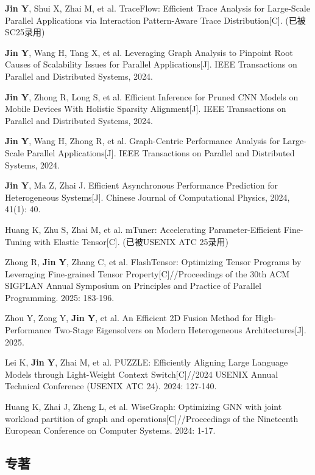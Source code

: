 \begin{resume}
  \begin{achievements}
    \item \textbf{Jin Y}, Shui X, Zhai M, et al. TraceFlow: Efficient Trace Analysis for Large-Scale Parallel Applications via Interaction Pattern-Aware Trace Distribution[C]. (已被SC25录用)
    \item \textbf{Jin Y}, Wang H, Tang X, et al. Leveraging Graph Analysis to Pinpoint Root Causes of Scalability Issues for Parallel Applications[J]. IEEE Transactions on Parallel and Distributed Systems, 2024.
    \item \textbf{Jin Y}, Zhong R, Long S, et al. Efficient Inference for Pruned CNN Models on Mobile Devices With Holistic Sparsity Alignment[J]. IEEE Transactions on Parallel and Distributed Systems, 2024.
    \item \textbf{Jin Y}, Wang H, Zhong R, et al. Graph-Centric Performance Analysis for Large-Scale Parallel Applications[J]. IEEE Transactions on Parallel and Distributed Systems, 2024.
    \item \textbf{Jin Y}, Ma Z, Zhai J. Efficient Asynchronous Performance Prediction for Heterogeneous Systems[J]. Chinese Journal of Computational Physics, 2024, 41(1): 40.
    \item Huang K, Zhu S, Zhai M, et al. mTuner: Accelerating Parameter-Efficient Fine-Tuning with Elastic Tensor[C]. (已被USENIX ATC 25录用)
    \item Zhong R, \textbf{Jin Y}, Zhang C, et al. FlashTensor: Optimizing Tensor Programs by Leveraging Fine-grained Tensor Property[C]//Proceedings of the 30th ACM SIGPLAN Annual Symposium on Principles and Practice of Parallel Programming. 2025: 183-196.
    \item Zhou Y, Zong Y, \textbf{Jin Y}, et al. An Efficient 2D Fusion Method for High-Performance Two-Stage Eigensolvers on Modern Heterogeneous Architectures[J]. 2025.
    \item Lei K, \textbf{Jin Y}, Zhai M, et al. {PUZZLE}: Efficiently Aligning Large Language Models through {Light-Weight} Context Switch[C]//2024 USENIX Annual Technical Conference (USENIX ATC 24). 2024: 127-140.
    \item Huang K, Zhai J, Zheng L, et al. WiseGraph: Optimizing GNN with joint workload partition of graph and operations[C]//Proceedings of the Nineteenth European Conference on Computer Systems. 2024: 1-17.
  \end{achievements}


  \subsection*{专著}


\end{resume}
